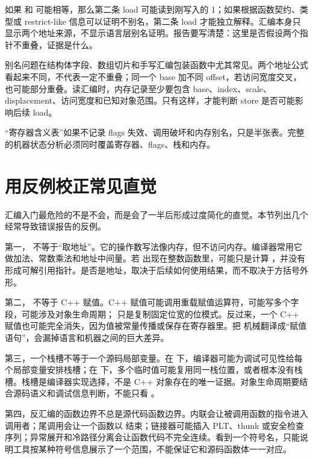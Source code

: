 如果  和  可能相等，那么第二条 load 可能读到刚写入的 1；如果根据函数契约、类型或 restrict-like 信息可以证明不别名，第二条 load 才能独立解释。汇编本身只显示两个地址来源，不显示语言层别名证明。报告要写清楚：这里是否假设两个指针不重叠，证据是什么。

别名问题在结构体字段、数组切片和手写汇编包装函数中尤其常见。两个地址公式看起来不同，不代表一定不重叠；同一个 base 加不同 offset，若访问宽度交叉，也可能部分重叠。读汇编时，内存记录至少要包含 base、index、scale、displacement、访问宽度和已知对象范围。只有这样，才能判断 store 是否可能影响后续 load。

\begin{warningbox}
“寄存器含义表”如果不记录 flags 失效、调用破坏和内存别名，只是半张表。完整的机器状态分析必须同时覆盖寄存器、flags、栈和内存。
\end{warningbox}

\section{用反例校正常见直觉}

汇编入门最危险的不是不会，而是会了一半后形成过度简化的直觉。本节列出几个经常导致错误报告的反例。

第一， 不等于“取地址”。它的操作数写法像内存，但不访问内存。编译器常用它做加法、常数乘法和地址中间量。若  出现在整数函数里，可能只是计算 ，并没有形成可解引用指针。是否是地址，取决于后续如何使用结果，而不取决于方括号外形。

第二， 不等于 C++ 赋值。C++ 赋值可能调用重载赋值运算符，可能写多个字段，可能涉及对象生命周期； 只是复制固定位宽的位模式。反过来，一个 C++ 赋值也可能完全消失，因为值被常量传播或保存在寄存器里。把  机械翻译成“赋值语句”，会漏掉语言和机器之间的巨大差异。

第三，一个栈槽不等于一个源码局部变量。在  下，编译器可能为调试可见性给每个局部变量安排栈槽；在  下，多个临时值可能复用同一栈位置，或者根本没有栈槽。栈槽是编译器实现选择，不是 C++ 对象存在的唯一证据。对象生命周期要结合源码语义和调试信息判断，不能只看 \code{[rbp - 4]}。

第四，反汇编的函数边界不总是源代码函数边界。内联会让被调用函数的指令进入调用者；尾调用会让一个函数以  结束；链接器可能插入 PLT、thunk 或安全检查序列；异常展开和冷路径分离会让函数代码不完全连续。看到一个符号名，只能说明工具按某种符号信息展示了一个范围，不能保证它和源码函数体一一对应。

